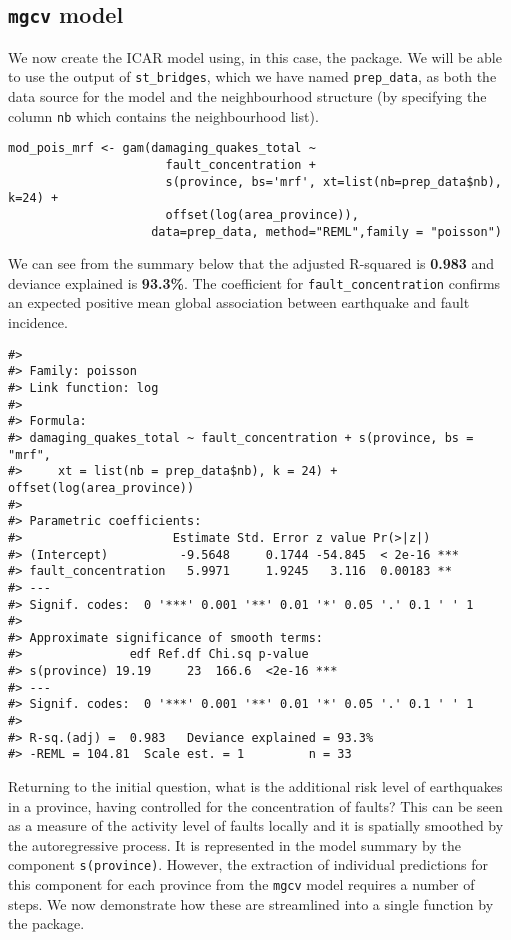 \hypertarget{mgcv-model}{%
\subsection{\texorpdfstring{\texttt{mgcv} model}{mgcv model}}\label{mgcv-model}}

We now create the ICAR model using, in this case, the  package. We will be able to use the output of \texttt{st\_bridges}, which we have named \texttt{prep\_data}, as both the data source for the model and the neighbourhood structure (by specifying the column \texttt{nb} which contains the neighbourhood list).

\begin{verbatim}
mod_pois_mrf <- gam(damaging_quakes_total ~ 
                      fault_concentration +
                      s(province, bs='mrf', xt=list(nb=prep_data$nb), k=24) +
                      offset(log(area_province)),
                    data=prep_data, method="REML",family = "poisson")
\end{verbatim}

We can see from the summary below that the adjusted R-squared is \textbf{0.983} and deviance explained is \textbf{93.3\%}. The coefficient for \texttt{fault\_concentration} confirms an expected positive mean global association between earthquake and fault incidence.

\begin{verbatim}
#> 
#> Family: poisson 
#> Link function: log 
#> 
#> Formula:
#> damaging_quakes_total ~ fault_concentration + s(province, bs = "mrf", 
#>     xt = list(nb = prep_data$nb), k = 24) + offset(log(area_province))
#> 
#> Parametric coefficients:
#>                     Estimate Std. Error z value Pr(>|z|)    
#> (Intercept)          -9.5648     0.1744 -54.845  < 2e-16 ***
#> fault_concentration   5.9971     1.9245   3.116  0.00183 ** 
#> ---
#> Signif. codes:  0 '***' 0.001 '**' 0.01 '*' 0.05 '.' 0.1 ' ' 1
#> 
#> Approximate significance of smooth terms:
#>               edf Ref.df Chi.sq p-value    
#> s(province) 19.19     23  166.6  <2e-16 ***
#> ---
#> Signif. codes:  0 '***' 0.001 '**' 0.01 '*' 0.05 '.' 0.1 ' ' 1
#> 
#> R-sq.(adj) =  0.983   Deviance explained = 93.3%
#> -REML = 104.81  Scale est. = 1         n = 33
\end{verbatim}

Returning to the initial question, what is the additional risk level of earthquakes in a province, having controlled for the concentration of faults? This can be seen as a measure of the activity level of faults locally and it is spatially smoothed by the autoregressive process. It is represented in the model summary by the component \texttt{s(province)}. However, the extraction of individual predictions for this component for each province from the \texttt{mgcv} model requires a number of steps. We now demonstrate how these are streamlined into a single function by the  package.

